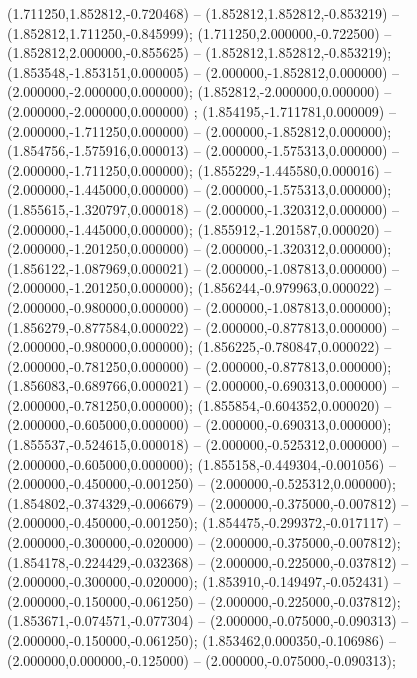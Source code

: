  (1.711250,1.852812,-0.720468) -- (1.852812,1.852812,-0.853219) -- (1.852812,1.711250,-0.845999);
 (1.711250,2.000000,-0.722500) -- (1.852812,2.000000,-0.855625) -- (1.852812,1.852812,-0.853219);
 (1.853548,-1.853151,0.000005) -- (2.000000,-1.852812,0.000000) -- (2.000000,-2.000000,0.000000);
 (1.852812,-2.000000,0.000000) -- (2.000000,-2.000000,0.000000) ;
 (1.854195,-1.711781,0.000009) -- (2.000000,-1.711250,0.000000) -- (2.000000,-1.852812,0.000000);
 (1.854756,-1.575916,0.000013) -- (2.000000,-1.575313,0.000000) -- (2.000000,-1.711250,0.000000);
 (1.855229,-1.445580,0.000016) -- (2.000000,-1.445000,0.000000) -- (2.000000,-1.575313,0.000000);
 (1.855615,-1.320797,0.000018) -- (2.000000,-1.320312,0.000000) -- (2.000000,-1.445000,0.000000);
 (1.855912,-1.201587,0.000020) -- (2.000000,-1.201250,0.000000) -- (2.000000,-1.320312,0.000000);
 (1.856122,-1.087969,0.000021) -- (2.000000,-1.087813,0.000000) -- (2.000000,-1.201250,0.000000);
 (1.856244,-0.979963,0.000022) -- (2.000000,-0.980000,0.000000) -- (2.000000,-1.087813,0.000000);
 (1.856279,-0.877584,0.000022) -- (2.000000,-0.877813,0.000000) -- (2.000000,-0.980000,0.000000);
 (1.856225,-0.780847,0.000022) -- (2.000000,-0.781250,0.000000) -- (2.000000,-0.877813,0.000000);
 (1.856083,-0.689766,0.000021) -- (2.000000,-0.690313,0.000000) -- (2.000000,-0.781250,0.000000);
 (1.855854,-0.604352,0.000020) -- (2.000000,-0.605000,0.000000) -- (2.000000,-0.690313,0.000000);
 (1.855537,-0.524615,0.000018) -- (2.000000,-0.525312,0.000000) -- (2.000000,-0.605000,0.000000);
 (1.855158,-0.449304,-0.001056) -- (2.000000,-0.450000,-0.001250) -- (2.000000,-0.525312,0.000000);
 (1.854802,-0.374329,-0.006679) -- (2.000000,-0.375000,-0.007812) -- (2.000000,-0.450000,-0.001250);
 (1.854475,-0.299372,-0.017117) -- (2.000000,-0.300000,-0.020000) -- (2.000000,-0.375000,-0.007812);
 (1.854178,-0.224429,-0.032368) -- (2.000000,-0.225000,-0.037812) -- (2.000000,-0.300000,-0.020000);
 (1.853910,-0.149497,-0.052431) -- (2.000000,-0.150000,-0.061250) -- (2.000000,-0.225000,-0.037812);
 (1.853671,-0.074571,-0.077304) -- (2.000000,-0.075000,-0.090313) -- (2.000000,-0.150000,-0.061250);
 (1.853462,0.000350,-0.106986) -- (2.000000,0.000000,-0.125000) -- (2.000000,-0.075000,-0.090313);
